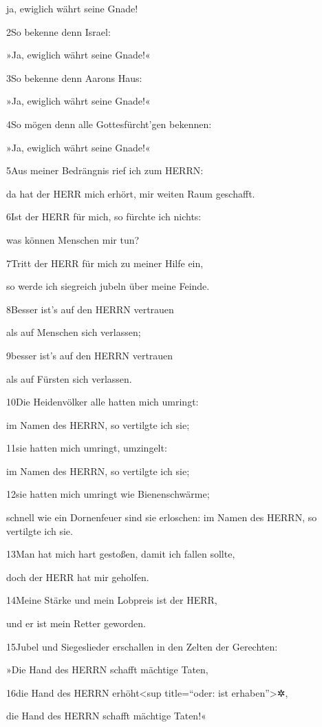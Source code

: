 ja, ewiglich währt seine Gnade!

2So bekenne denn Israel:

»Ja, ewiglich währt seine Gnade!«

3So bekenne denn Aarons Haus:

»Ja, ewiglich währt seine Gnade!«

4So mögen denn alle Gottesfürcht'gen bekennen:

»Ja, ewiglich währt seine Gnade!«

5Aus meiner Bedrängnis rief ich zum HERRN:

da hat der HERR mich erhört, mir weiten Raum geschafft.

6Ist der HERR für mich, so fürchte ich nichts:

was können Menschen mir tun?

7Tritt der HERR für mich zu meiner Hilfe ein,

so werde ich siegreich jubeln über meine Feinde.

8Besser ist's auf den HERRN vertrauen

als auf Menschen sich verlassen;

9besser ist's auf den HERRN vertrauen

als auf Fürsten sich verlassen.

10Die Heidenvölker alle hatten mich umringt:

im Namen des HERRN, so vertilgte ich sie;

11sie hatten mich umringt, umzingelt:

im Namen des HERRN, so vertilgte ich sie;

12sie hatten mich umringt wie Bienenschwärme;

schnell wie ein Dornenfeuer sind sie erloschen: im Namen des HERRN, so
vertilgte ich sie.

13Man hat mich hart gestoßen, damit ich fallen sollte,

doch der HERR hat mir geholfen.

14Meine Stärke und mein Lobpreis ist der HERR,

und er ist mein Retter geworden.

15Jubel und Siegeslieder erschallen in den Zelten der Gerechten:

»Die Hand des HERRN schafft mächtige Taten,

16die Hand des HERRN erhöht\textless sup title=``oder: ist
erhaben''\textgreater✲,

die Hand des HERRN schafft mächtige Taten!«

